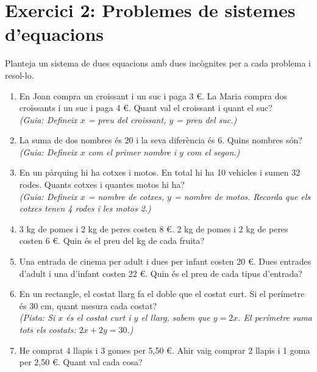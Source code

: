 \documentclass[12pt,a4paper]{article}
\begin{document}
\section*{Exercici 2: Problemes de sistemes d'equacions}
Planteja un sistema de dues equacions amb dues incògnites per a cada problema i resol-lo.

\begin{enumerate}[label=\textbf{\arabic*.}]
    \item En Joan compra un croissant i un suc i paga 3 €. La Maria compra dos croissants i un suc i paga 4 €. Quant val el croissant i quant el suc? \\
    {\small \textit{(Guia: Defineix $x$ = preu del croissant, $y$ = preu del suc.)}}
    
    \item La suma de dos nombres és 20 i la seva diferència és 6. Quins nombres són? \\
    {\small \textit{(Guia: Defineix $x$ com el primer nombre i $y$ com el segon.)}}
    
    \item En un pàrquing hi ha cotxes i motos. En total hi ha 10 vehicles i sumen 32 rodes. Quants cotxes i quantes motos hi ha? \\
    {\small \textit{(Guia: Defineix $x$ = nombre de cotxes, $y$ = nombre de motos. Recorda que els cotxes tenen 4 rodes i les motos 2.)}}
    
    \item 3 kg de pomes i 2 kg de peres costen 8 €. 2 kg de pomes i 2 kg de peres costen 6 €. Quin és el preu del kg de cada fruita?
    \item Una entrada de cinema per adult i dues per infant costen 20 €. Dues entrades d'adult i una d'infant costen 22 €. Quin és el preu de cada tipus d'entrada?
    
    \item En un rectangle, el costat llarg fa el doble que el costat curt. Si el perímetre és 30 cm, quant mesura cada costat? \\
    {\small \textit{(Pista: Si $x$ és el costat curt i $y$ el llarg, sabem que $y=2x$. El perímetre suma tots els costats: $2x + 2y = 30$.)}}
    
    \item He comprat 4 llapis i 3 gomes per 5,50 €. Ahir vaig comprar 2 llapis i 1 goma per 2,50 €. Quant val cada cosa?
    

\end{enumerate}
\end{document}
